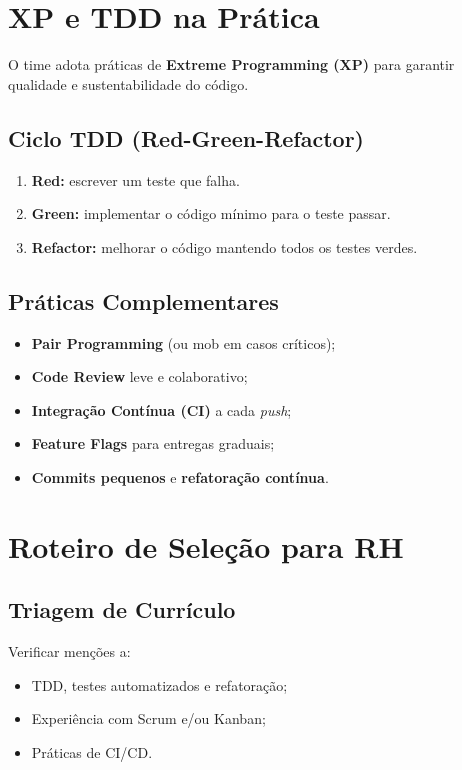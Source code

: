 \documentclass{article}
\begin{document}
\section{XP e TDD na Prática}

O time adota práticas de \textbf{Extreme Programming (XP)} para garantir qualidade e sustentabilidade do código.

\subsection*{Ciclo TDD (Red-Green-Refactor)}
\begin{enumerate}
    \item \textbf{Red:} escrever um teste que falha.
    \item \textbf{Green:} implementar o código mínimo para o teste passar.
    \item \textbf{Refactor:} melhorar o código mantendo todos os testes verdes.
\end{enumerate}

\subsection*{Práticas Complementares}
\begin{itemize}[noitemsep]
    \item \textbf{Pair Programming} (ou mob em casos críticos);
    \item \textbf{Code Review} leve e colaborativo;
    \item \textbf{Integração Contínua (CI)} a cada \textit{push};
    \item \textbf{Feature Flags} para entregas graduais;
    \item \textbf{Commits pequenos} e \textbf{refatoração contínua}.
\end{itemize}

\section{Roteiro de Seleção para RH}

\subsection*{Triagem de Currículo}
Verificar menções a:
\begin{itemize}[noitemsep]
    \item TDD, testes automatizados e refatoração;
    \item Experiência com Scrum e/ou Kanban;
    \item Práticas de CI/CD.
\end{itemize}
\end{document}
